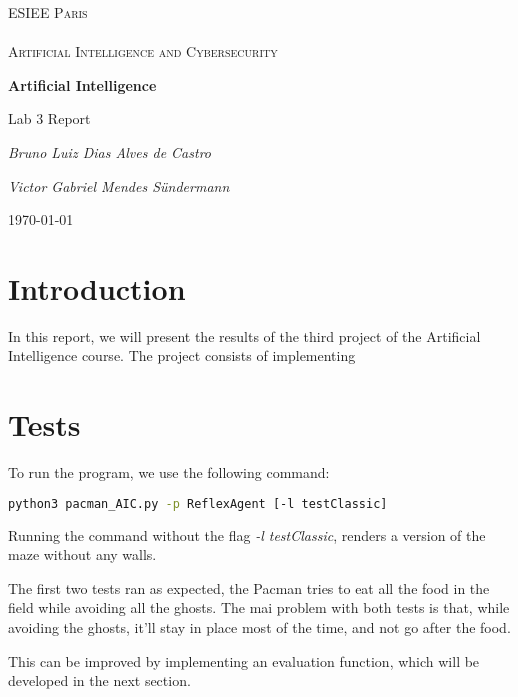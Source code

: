 \documentclass{article}
\begin{document}
\begin{titlepage}
\centering
{\textsc{\Large ESIEE Paris \\ ~\\ Artificial Intelligence and Cybersecurity} \par}
\vfill
{\huge\bfseries Artificial Intelligence \par}
\vspace{0.5cm}
{\LARGE Lab 3 Report \par}
\vspace{2cm}
{\Large\itshape Bruno Luiz Dias Alves de Castro \par}
{\Large\itshape Victor Gabriel Mendes Sündermann \par}
\vfill

{\large \today\par}
\end{titlepage}

\pagebreak
\tableofcontents
\pagebreak

\section{Introduction}

In this report, we will present the results of the third project of the Artificial Intelligence course. The project consists of implementing

\section{Tests}
To run the program, we use the following command:

\hbox{}

\begin{lstlisting}[language=bash, frame=tlbr, framesep=6pt, backgroundcolor=\color{light-gray}]
  python3 pacman_AIC.py -p ReflexAgent [-l testClassic]
\end{lstlisting}

\hbox{}

Running the command without the flag \textit{-l testClassic}, renders a version of the maze without any walls.

The first two tests ran as expected, the Pacman tries to eat all the food in the field while avoiding all the ghosts. The mai problem with both tests is that, while avoiding the ghosts, it'll stay in place most of the time, and not go after the food.

This can be improved by implementing an evaluation function, which will be developed in the next section.
\end{document}
